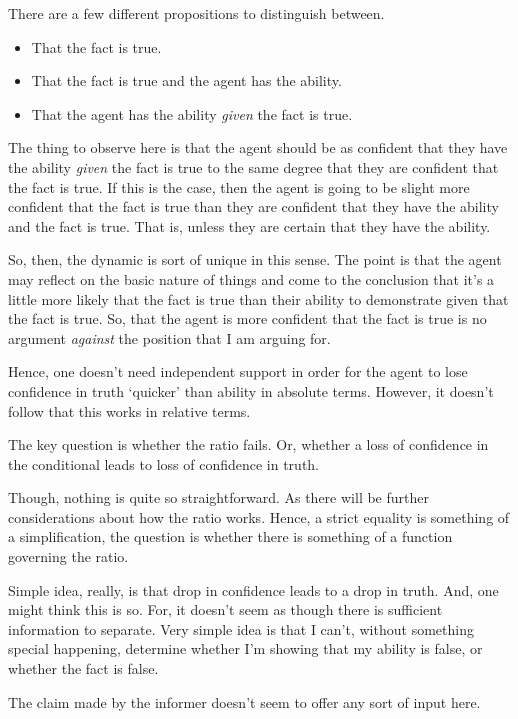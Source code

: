 \documentclass[10pt]{article}
\begin{document}
\begin{note}
  There are a few different propositions to distinguish between.
  \begin{itemize}
  \item That the fact is true.
  \item That the fact is true and the agent has the ability.
  \item That the agent has the ability \emph{given} the fact is true.
  \end{itemize}
  The thing to observe here is that the agent should be as confident that they have the ability \emph{given} the fact is true to the same degree that they are confident that the fact is true.
  If this is the case, then the agent is going to be slight more confident that the fact is true than they are confident that they have the ability and the fact is true.
  That is, unless they are certain that they have the ability.

  So, then, the dynamic is sort of unique in this sense.
  The point is that the agent may reflect on the basic nature of things and come to the conclusion that it's a little more likely that the fact is true than their ability to demonstrate given that the fact is true.
  So, that the agent is more confident that the fact is true is no argument \emph{against} the position that I am arguing for.

  Hence, one doesn't need independent support in order for the agent to lose confidence in truth `quicker' than ability in absolute terms.
  However, it doesn't follow that this works in relative terms.

  The key question is whether the ratio fails.
  Or, whether a loss of confidence in the conditional leads to loss of confidence in truth.

  Though, nothing is quite so straightforward.
  As there will be further considerations about how the ratio works.
  Hence, a strict equality is something of a simplification, the question is whether there is something of a function governing the ratio.

  Simple idea, really, is that drop in confidence leads to a drop in truth.
  And, one might think this is so.
  For, it doesn't seem as though there is sufficient information to separate.
  Very simple idea is that I can't, without something special happening, determine whether I'm showing that my ability is false, or whether the fact is false.

  The claim made by the informer doesn't seem to offer any sort of input here.


\end{note}
\end{document}

